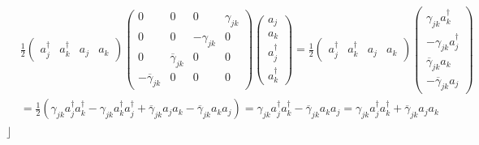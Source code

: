\documentclass[aps, preprint]{revtex4}
\begin{document}
\begin{align} & \frac{1}{2} \left (\begin{array}{cccc}a_{j}^{ \dag } & a_{k}^{ \dag } & a_{j} & a_{k}\end{array}\right ) \left (\begin{array}{cccc}0 & 0 & 0 & \gamma _{j k} \\
0 & 0 &  -\gamma _{j k} & 0 \\
0 & \overline{\gamma }_{j k} & 0 & 0 \\
 -\overline{\gamma }_{j k} & 0 & 0 & 0\end{array}\right ) \left (\begin{array}{c}a_{j} \\
a_{k} \\
a_{j}^{ \dag } \\
a_{k}^{ \dag }\end{array}\right ) =\frac{1}{2} \left (\begin{array}{cccc}a_{j}^{ \dag } & a_{k}^{ \dag } & a_{j} & a_{k}\end{array}\right ) \left (\begin{array}{c}\gamma _{j k} a_{k}^{ \dag } \\
 -\gamma _{j k} a_{j}^{ \dag } \\
\overline{\gamma }_{j k} a_{k} \\
 -\overline{\gamma }_{j k} a_{j}\end{array}\right ) \\
 &  =\frac{1}{2} \left (\gamma _{j k} a_{j}^{ \dag } a_{k}^{ \dag } -\gamma _{j k} a_{k}^{ \dag } a_{j}^{ \dag } +\overline{\gamma }_{j k} a_{j} a_{k} -\overline{\gamma }_{j k} a_{k} a_{j}\right ) =\gamma _{j k} a_{j}^{ \dag } a_{k}^{ \dag } -\overline{\gamma }_{j k} a_{k} a_{j} =\gamma _{j k} a_{j}^{ \dag } a_{k}^{ \dag } +\overline{\gamma }_{j k} a_{j} a_{k}\end{align}$\rfloor $ 
\end{document}
